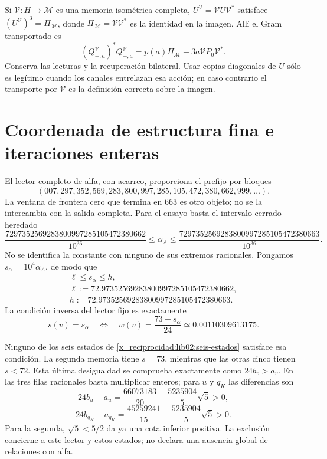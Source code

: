 Si \(\mathcal V:H\to\mathcal M\) es una memoria isométrica
completa, \(U^{\mathcal V}=\mathcal VU\mathcal V^*\) satisface
\((U^{\mathcal V})^3=\Pi_{\mathcal M}\), donde
\(\Pi_{\mathcal M}=\mathcal V\mathcal V^*\) es la identidad en
la imagen. Allí el Gram transportado es
\[
 (Q_{-,a}^{\mathcal V})^*Q_{-,a}^{\mathcal V}
 =p(a)\Pi_{\mathcal M}-3a\mathcal VP_0\mathcal V^*.
\]
Conserva las lecturas y la recuperación bilateral. Usar copias diagonales
de \(U\) sólo es legítimo cuando los canales entrelazan esa acción;
en caso contrario el transporte por \(\mathcal V\) es la definición
correcta sobre la imagen.

\section{Coordenada de estructura fina e iteraciones enteras}
\label{x_reciprocidad:lib02:ensayo-inverso}

El lector completo de alfa, con acarreo, proporciona el prefijo por
bloques
\[
 (007,297,352,569,283,800,997,285,105,472,380,662,999,\ldots).
\]
La ventana de frontera cero que termina en 663 es otro objeto; no se la
intercambia con la salida completa. Para el ensayo basta el intervalo
cerrado heredado
\begin{equation}
 \frac{7297352569283800997285105472380662}{10^{36}}
 \leq\alpha_A\leq
 \frac{7297352569283800997285105472380663}{10^{36}}.
 \label{x_reciprocidad:lib02:intervalo-alpha}
\end{equation}
No se identifica la constante con ninguno de sus extremos racionales.
Pongamos \(s_\alpha=10^4\alpha_A\), de modo que
\begin{equation}
 \begin{gathered}
 \ell\leq s_\alpha\leq h,\\
 \ell:=72.97352569283800997285105472380662,\\
 h:=72.97352569283800997285105472380663.
 \end{gathered}
 \label{x_reciprocidad:lib02:intervalo-s}
\end{equation}
La condición inversa del lector fijo es exactamente
\begin{equation}
 s(v)=s_\alpha
 \quad\Longleftrightarrow\quad
 w(v)=\frac{73-s_\alpha}{24}
 \simeq0.00110309613175.
 \label{x_reciprocidad:lib02:criterio-alpha}
\end{equation}

Ninguno de los seis estados de \cref{x_reciprocidad:lib02:seis-estados} satisface esa
condición. La segunda memoria tiene \(s=73\), mientras que las otras
cinco tienen \(s<72\). Esta última desigualdad se comprueba exactamente
como \(24b_v>a_v\). En las tres filas racionales basta multiplicar
enteros; para \(u\) y \(q_K\) las diferencias son
\[
 24b_u-a_u=\frac{66073183}{20}+\frac{5235904}{5}\sqrt5>0,
\]
\[
 24b_{q_K}-a_{q_K}
 =\frac{45259241}{15}-\frac{5235904}{5}\sqrt5>0.
\]
Para la segunda, \(\sqrt5<5/2\) da ya una cota inferior positiva.
La exclusión concierne a este lector y estos estados; no declara una
ausencia global de relaciones con alfa.

